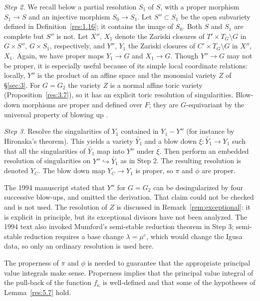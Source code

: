 \documentclass[12pt,letterpaper]{amsart}
\theoremstyle{plain}
\theoremstyle{definition}
\theoremstyle{remark}
\theoremstyle{definition}
\begin{document}
\emph{Step 2.} We recall below a partial resolution $S_1$ of $S$, with a
proper morphism $S_1\rightarrow S$ and an injective morphism
$S_0\rightarrow S_1$. Let $S''\subset S_1$ be the open subvariety defined in
Definition~\ref{res:1.16}; it contains the image of $S_0$.
Both $S$ and $S_1$ are complete but $S''$ is not.
Let $X''$, $X_1$ denote the Zariski closures of $T'\times T_G\setminus G$
in $G\times S''$, $G\times S_1$, respectively, and
$Y''$, $Y_1$ the Zariski closures of $C'\times T_G\setminus G$
in $X''$, $X_1$. Again, we have proper maps
$Y_1\rightarrow G$ and $X_1\rightarrow G$. Though $Y''\rightarrow G$
may not be proper, it is especially useful because
of its simple local coordinate relations: locally, $Y''$ is the product of an
affine space and the monomial variety $Z$ of \S\ref{sec:3}.
For $G=G_2$ the variety $Z$ is a normal affine toric variety
(Proposition~\ref{res:3.7}), so it has an explicit toric resolution of
singularities. Blow-down morphisms are proper and defined over $F$; they are
$G$-equivariant by the universal property of blowing up \cite{Har77}.

\emph{Step 3.} Resolve the singularities of $Y_1$ contained in
$Y_1-Y''$ (for instance by Hironaka's theorem).
This yields a variety $\tilde{Y_1}$ and a blow down
$\xi:\tilde{Y_1}\rightarrow Y_1$ such that all the singularities
of $\tilde{Y_1}$ map into $Y''$ under $\xi$. Then
perform an embedded resolution of singularities on
$Y''\hookrightarrow \tilde{Y_1}$ as in Step 2. The resulting
resolution is denoted $Y_C$. The blow down map $Y_C\rightarrow Y_1$
is proper, so $\pi$ and $\phi$ are proper.

\begin{rem26}\label{rem:steps}
The 1994 manuscript stated that $Y''$ for $G=G_2$ can be desingularized by
four successive blow-ups, and omitted the derivation. That claim could not be
checked and is not used. The resolution of $Z$ is discussed in
Remark~\ref{rem:exceptional}: it is explicit in principle, but its
exceptional divisors have not been analyzed. The 1994 text also invoked
Mumford's semi-stable reduction theorem in Step 3; semi-stable reduction
requires a base change $\lambda=\mu^e$, which would change the Igusa data, so
only an ordinary resolution is used here.
\end{rem26}

The properness of $\pi$ and
$\phi$ is needed to guarantee that the appropriate
principal value integrals make sense. Properness implies that
the principal value integral of the
pull-back of the function $f_\kappa$ is well-defined
and that some of the hypotheses of Lemma~\ref{res:5.7} hold.
\end{document}
